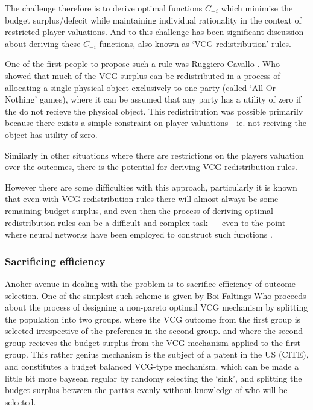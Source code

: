 The challenge therefore is to derive optimal functions $C_{-i}$ which minimise the budget surplus/defecit while maintaining individual rationality in the context of restricted player valuations.
And to this challenge has been significant discussion about deriving these $C_{-i}$ functions, also known as `VCG redistribution' rules.

One of the first people to propose such a rule was Ruggiero Cavallo \cite{Cavallo:2006:ODM:1160633.1160790}.%
Who showed that much of the VCG surplus can be redistributed in a process of allocating a single physical object exclusively to one party (called `All-Or-Nothing' games), where it can be assumed that any party has a utility of zero if the do not recieve the physical object.
This redistribution was possible primarily because there exists a simple constraint on player valuations - ie. not reciving the object has utility of zero.

Similarly in other situations where there are restrictions on the players valuation over the outcomes, there is the potential for deriving VCG redistribution rules.

However there are some difficulties with this approach, particularly it is known that even with VCG redistribution rules there will almost always be some remaining budget surplus, and even then the process of deriving optimal redistribution rules can be a difficult and complex task --- even to the point where neural networks have been employed to construct such functions \cite{DBLP:conf/atal/ManishaJG18}.

\subsubsection{Sacrificing efficiency}

Anoher avenue in dealing with the problem is to sacrifice efficiency of outcome selection.
One of the simplest such scheme is given by Boi Faltings \cite{10.1007/978-3-642-25510-6_14}
Who proceeds about the process of designing a non-pareto optimal VCG mechanism by splitting the population into two groups, where the VCG outcome from the first group is selected irrespective of the preferencs in the second group.
and where the second group recieves the budget surplus from the VCG mechanism applied to the first group.
This rather genius mechanism is the subject of a patent in the US (CITE), and constitutes a budget balanced VCG-type mechanism.
which can be made a little bit more baysean regular by randomy selecting the `sink', and splitting the budget surplus between the parties evenly without knowledge of who will be selected.\cite{10.1007/978-3-642-25510-6_14}

